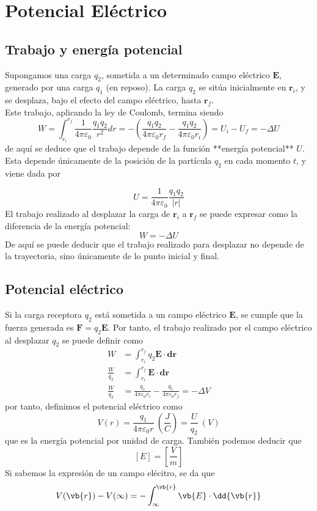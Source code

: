 \documentclass{./FisicaII.tex}
\begin{document}
\chapter{Potencial Eléctrico}
\section{Trabajo y energía potencial}
Supongamos una carga $q_{2}$, sometida a un determinado campo eléctrico $\mathbf{E}$, generado por una carga $q_{1}$ (en reposo). La carga $q_{2}$ se sitúa inicialmente  en $\mathbf{r}_{i}$, y se desplaza, bajo el efecto del campo eléctrico, hasta $\mathbf{r}_{f}$.\\
Este trabajo, aplicando la ley de Coulomb, termina siendo
$$
W=\int_{r_{i}}^{r_{f}} \frac{1}{4\pi\varepsilon_{0}} \frac{q_{1}q_{2}}{r^2}dr = -\left( \frac{q_{1}q_{2}}{4\pi\varepsilon_{0}r_{f}} - \frac{q_{1}q_{2}}{4\pi\varepsilon_{0}r_{i}} \right)=U_{i}-U_{f}=-\Delta U
$$
de aquí se deduce que el trabajo depende de la función **energía potencial** $U$. Esta depende únicamente de la posición de la partícula $q_{2}$ en cada momento $t$, y viene dada por

$$
\boxed{
U=\frac{1}{4\pi\varepsilon_{0}} \frac{q_{1}q_{2}}{|r|}
}
$$
El trabajo realizado al desplazar la carga de $\mathbf{r}_{i}$ a $\mathbf{r}_{f}$ se puede expresar como la diferencia de la energía potencial:
$$
W=-\Delta U
$$
De aquí se puede deducir que el trabajo realizado para desplazar no depende de la trayectoria, sino únicamente de lo punto inicial y final.
\section{Potencial eléctrico}
Si la carga receptora $q_{2}$ está sometida a un campo eléctrico $\mathbf{E}$, se cumple que la fuerza generada es $\mathbf{F}=q_{2}\mathbf{E}$. Por tanto, el trabajo realizado por el campo eléctrico al desplazar $q_{2}$ se puede definir como
\begin{equation}
	\begin{split}
W&=\int_{r_{i}}^{r_{f}}q_{2}\mathbf{E}\cdot \mathbf{dr}\\
\frac{W}{q_{2}} &= \int_{r_{i}}^{r_{f}}\mathbf{E}\cdot \mathbf{dr}\\
\frac{W}{q_{2}}&= \frac{q_{1}}{4\pi\varepsilon_{0}r_{i}}-\frac{q_{1}}{4\pi\varepsilon_{0}r_{f}}=-\Delta V
	\end{split}
\end{equation}
por tanto, definimos el potencial eléctrico como
$$
\boxed{
V(r) = \frac{q_{1}}{4\pi\varepsilon_{0}r}~ \left( \frac{J}{C} \right) = \frac{U}{q_{2}}~(V)
}
$$
que es la energía potencial por unidad de carga. También podemos deducir que
$$
[E]=\left[ \frac{V}{m} \right]
$$
Si sabemos la expresión de un campo elécitro, se da que
\begin{equation}
	\begin{split}
		V(\vb{r}) - V(\infty) = -\int_{\infty}^{\vb{r}}\vb{E}\cdot \dd{\vb{r}}
	\end{split}
\end{equation}
\end{document}
